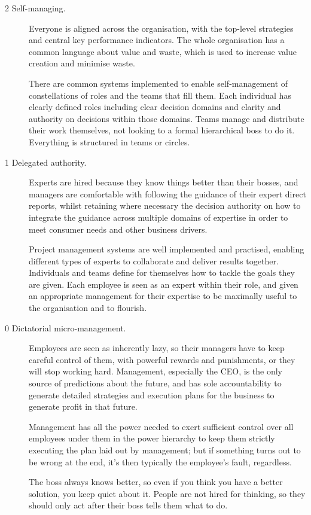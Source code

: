 \begin{description}
\item[2 Self-managing.]  
Everyone is aligned across the organisation, with the top-level strategies and central key performance indicators. The whole organisation has a common language about value and waste, which is used to increase value creation and minimise waste. 


There are common systems implemented to enable self-management of constellations of roles and the teams that fill them. Each individual has clearly defined roles including clear decision domains and clarity and authority on decisions within those domains. Teams manage and distribute their work themselves, not looking to a formal hierarchical boss to do it. Everything is structured in teams or circles.


\item[1 Delegated authority.]  
Experts are hired because they know things better than their bosses, and managers are comfortable with following the guidance of their expert direct reports, whilst retaining where necessary the decision authority on how to integrate the guidance across multiple domains of expertise in order to meet consumer needs and other business drivers. 


Project management systems are well implemented and practised, enabling different types of experts to collaborate and deliver results together. Individuals and teams define for themselves how to tackle the goals they are given. Each employee is seen as an expert within their role, and given an appropriate management for their expertise to be maximally useful to the organisation and to flourish.


\item[0 Dictatorial micro-management.]  
Employees are seen as inherently lazy, so their managers have to keep careful control of them, with powerful rewards and punishments, or they will stop working hard. Management, especially the CEO, is the only source of predictions about the future, and has sole accountability to generate detailed strategies and execution plans for the business to generate profit in that future. 


Management has all the power needed to exert sufficient control over all employees under them in the power hierarchy to keep them strictly executing the plan laid out by management; but if something turns out to be wrong at the end, it's then typically the employee’s fault, regardless. 


The boss always knows better, so even if you think you have a better solution, you keep quiet about it. People are not hired for thinking, so they should only act after their boss tells them what to do.
\end{description}


